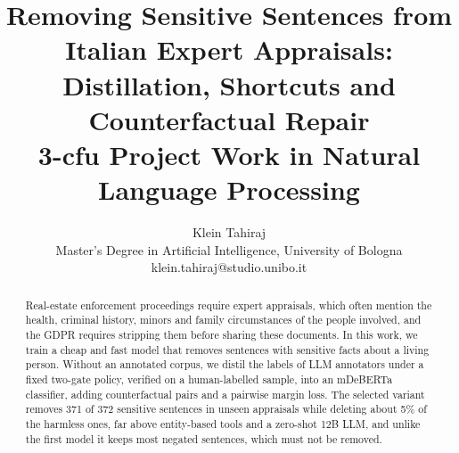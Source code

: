 \documentclass[11pt]{article}
\begin{document}
%
\title{Removing Sensitive Sentences from Italian Expert Appraisals:\\ Distillation, Shortcuts and Counterfactual Repair\\
\large 
3-cfu Project Work in Natural Language Processing
}
\author{Klein Tahiraj\\
Master's Degree in Artificial Intelligence, University of Bologna\\
klein.tahiraj@studio.unibo.it
}
\maketitle


\begin{abstract}

Real-estate enforcement proceedings require expert appraisals, which often mention the health, criminal history, minors and family circumstances of the people involved, and the GDPR requires stripping them before sharing these documents. In this work, we train a cheap and fast model that removes sentences with sensitive facts about a living person. Without an annotated corpus, we distil the labels of LLM annotators under a fixed two-gate policy, verified on a human-labelled sample, into an mDeBERTa classifier, adding counterfactual pairs and a pairwise margin loss. The selected variant removes 371 of 372 sensitive sentences in unseen appraisals while deleting about 5\% of the harmless ones, far above entity-based tools and a zero-shot 12B LLM, and unlike the first model it keeps most negated sentences, which must not be removed.


\end{abstract}
\end{document}
